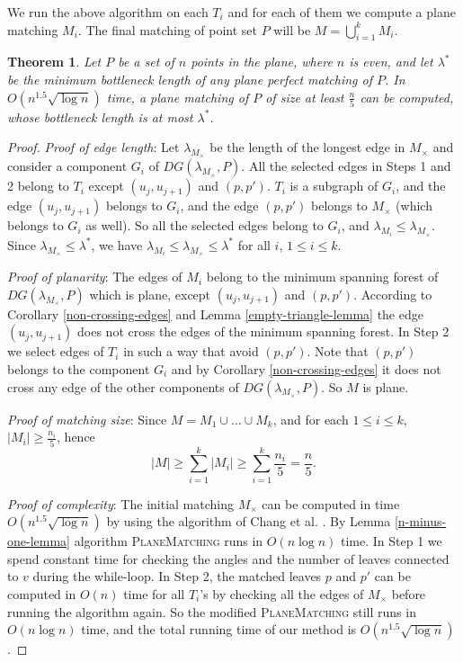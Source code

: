 \documentclass[11pt,a4paper]{article}
\newcommand{\MC}{M_\times}
\newcommand{\bt}{\lambda}
\newcommand{\btopt}{\lambda^*}
\newtheorem{theorem}{Theorem}
\begin{document}
We run the above algorithm on each $T_i$ and for each of them we compute a plane matching $M_i$. The final matching of point set $P$ will be $M=\bigcup_{i=1}^{k} M_i$.

\begin{theorem}
\label{two-over-five-theorem}
Let $P$ be a set of $n$ points in the plane, where $n$ is even, and let $\btopt$ be the minimum bottleneck length of any plane perfect matching of $P$. In $O(n^{1.5}\sqrt{\log n})$ time, a plane matching of $P$ of size at least $\frac{n}{5}$ can be computed, whose bottleneck length is at most $\btopt$.
\end{theorem}
\begin{proof}

{\em Proof of edge length}: Let $\bt_{\MC}$ be the length of the longest edge in $\MC$ and consider a component $G_i$ of $DG(\bt_{\MC}, P)$. All the selected edges in Steps 1 and 2 belong to $T_i$ except $(u_j,u_{j+1})$ and $(p,p')$. $T_i$ is a subgraph of $G_i$, and the edge $(u_j,u_{j+1})$ belongs to $G_i$, and the edge $(p,p')$ belongs to $\MC$ (which belongs to $G_i$ as well). So all the selected edges belong to $G_i$, and $\bt_{M_i}\le \bt_{\MC}$. Since $\bt_{\MC}\le \btopt$, we have $\bt_{M_i}\le \bt_{\MC}\le \btopt$ for all $i$, $1\le i \le k$.

 {\em Proof of planarity}: The edges of $M_i$ belong to the minimum spanning forest of $DG(\bt_{\MC}, P)$ which is plane, except $(u_j,u_{j+1})$ and $(p,p')$. According to Corollary \ref{non-crossing-edges} and Lemma \ref{empty-triangle-lemma} the edge $(u_j,u_{j+1})$ does not cross the edges of the minimum spanning forest. In Step 2 we select edges of $T_i$ in such a way that avoid $(p,p')$. Note that $(p,p')$ belongs to the component $G_i$ and by Corollary \ref{non-crossing-edges} it does not cross any edge of the other components of $DG(\bt_{\MC}, P)$. So $M$ is plane.

 {\em Proof of matching size}: Since $M=M_1\cup \dots \cup M_k$, and for each $1\le i\le k$, $|M_i|\ge \frac{n_i}{5}$, hence
$$
 |M|\ge \sum_{i=1}^{k} |M_i| \ge \sum_{i=1}^{k} \frac{n_i}{5} = \frac{n}{5}.
$$

 {\em Proof of complexity}: The initial matching $\MC$ can be computed in time $O(n^{1.5}\sqrt{\log n})$ by using the algorithm of Chang et al. \cite{Chang1992}. By Lemma \ref{n-minus-one-lemma} algorithm {\scshape PlaneMatching} runs in $O(n \log n)$ time. In Step 1 we spend constant time for checking the angles and the number of leaves connected to $v$ during the while-loop. In Step 2, the matched leaves $p$ and $p'$ can be computed in $O(n)$ time for all $T_i$'s by checking all the edges of $\MC$ before running the algorithm again. So the modified {\scshape PlaneMatching} still runs in $O(n \log n)$ time, and the total running time of our method is $O(n^{1.5}\sqrt{\log n})$.
\end{proof}
\end{document}
